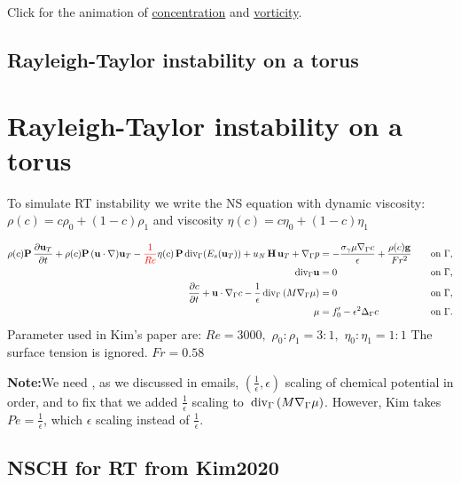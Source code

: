 \documentclass{article}
\newcommand{\vect}[1]{\boldsymbol{\mathbf{#1}}}
\newcommand{\bu}{\mathbf u}
\newcommand{\divG}{{\mathop{\,\rm div}}_{\Gamma}}
\newcommand{\gradG}{\nabla_{\Gamma}}
\newcommand{\nablaG}{\nabla_{\Gamma}}
\newcommand{\laplG}{\Delta_{\Gamma}}
\begin{document}
Click for the animation of \href{https://www.dropbox.com/s/efymgjo6drifeoj/KH-concentration-l5-lt1e3-lmyes-ltyes.avi?dl=0}{concentration} and \href{https://www.dropbox.com/s/mtjzgtt2ec7nuzj/KH-vorticity-l5-lt1e3-lmyes-ltyes.avi?dl=0}{vorticity}.



\subsection{Rayleigh-Taylor instability on a torus }



\section{Rayleigh-Taylor instability on a torus}

To simulate RT instability we write the NS equation with dynamic viscosity: $\rho(c)=c\rho_0+(1-c)\rho_1$ and viscosity $\eta(c)=c\eta_0+(1-c)\eta_1$

\begin{align}
\rho(c)\vect P\,\frac{\partial\vect u_T}{\partial t} + \rho(c)\vect P\,(\vect u\cdot\nabla)\vect u_T - {\color{red}\frac{1}{Re}}\eta(c)\,\vect P\divG(E_s(\vect u_T)) + u_N\,\vect H\,\vect u_T + \nabla_\Gamma p &=   - \frac{\sigma_\gamma \mu \nablaG c}{\epsilon} + \frac{\rho(c)\textbf{g}}{Fr^2} \quad &\text{on}~\Gamma,  \label{strongform-1} \\
\divG \bu & =0 \quad &\text{on}~\Gamma, \label{strongform-2}\\
\frac{\partial c}{\partial t} +\bu\cdot\nablaG c-  \frac{1}{\epsilon}\divG \left(M \gradG \mu \right)  &= 0 \quad &\text{on}~\Gamma \label{eq:sys_CH1}, \\
\mu &= f_0' - \epsilon^2 \laplG c \quad &\text{on}~\Gamma. \label{eq:sys_CH2}
\end{align}
Parameter used in Kim's \cite{YANG2020113382} paper are: $Re=3000,$ $\rho_0:\rho_1=3:1,$ $\eta_0:\eta_1=1:1$   The surface tension is ignored. $Fr=0.58$

{\color{red} \textbf{Note:}We need , as we discussed in emails, $(\frac{1}{\epsilon}, \epsilon)$ scaling of chemical potential in order, and to fix that we added $\frac{1}{\epsilon}$ scaling to $\divG \left(M \gradG \mu \right)$. However, Kim takes $Pe=\frac{1}{\epsilon}$, which $\epsilon$ scaling instead of $\frac{1}{\epsilon}$.}

\subsection{NSCH for RT from Kim2020\cite{YANG2020113382}}
\end{document}
